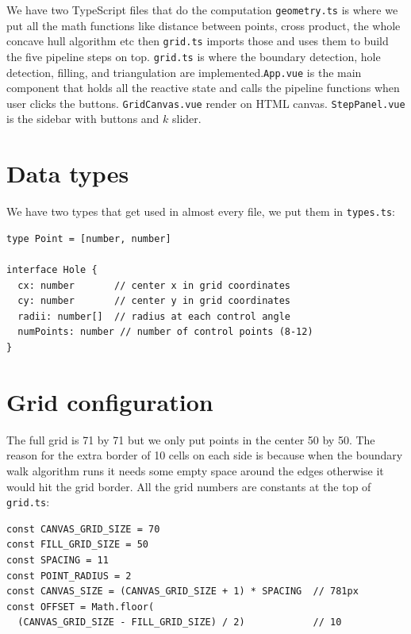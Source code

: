 \documentclass[12pt]{extreport}
\begin{document}
We have two TypeScript files that do the computation \texttt{geometry.ts} is where we put all the math functions like distance between points, cross product, the whole concave hull algorithm etc then \texttt{grid.ts} imports those and uses them to build the five pipeline steps on top. \texttt{grid.ts} is where the boundary detection, hole detection, filling, and triangulation are implemented.\texttt{App.vue} is the main component that holds all the reactive state and calls the pipeline functions when user clicks the buttons. \texttt{GridCanvas.vue} render on HTML canvas. \texttt{StepPanel.vue} is the sidebar with buttons and $k$ slider.

\section{Data types}

We have two types that get used in almost every file, we put them in \texttt{types.ts}:

\begin{lstlisting}[style=tsstyle, caption={Shared types (\texttt{types.ts})}]
type Point = [number, number]

interface Hole {
  cx: number       // center x in grid coordinates
  cy: number       // center y in grid coordinates
  radii: number[]  // radius at each control angle
  numPoints: number // number of control points (8-12)
}
\end{lstlisting}

\section{Grid configuration}

The full grid is 71 by 71 but we only put points in the center 50 by 50. The reason for the extra border of 10 cells on each side is because when the boundary walk algorithm runs it needs some empty space around the edges otherwise it would hit the grid border. All the grid numbers are constants at the top of \texttt{grid.ts}:

\begin{lstlisting}[style=tsstyle, caption={Grid constants (\texttt{grid.ts})}]
const CANVAS_GRID_SIZE = 70
const FILL_GRID_SIZE = 50
const SPACING = 11
const POINT_RADIUS = 2
const CANVAS_SIZE = (CANVAS_GRID_SIZE + 1) * SPACING  // 781px
const OFFSET = Math.floor(
  (CANVAS_GRID_SIZE - FILL_GRID_SIZE) / 2)            // 10
\end{lstlisting}
\end{document}
